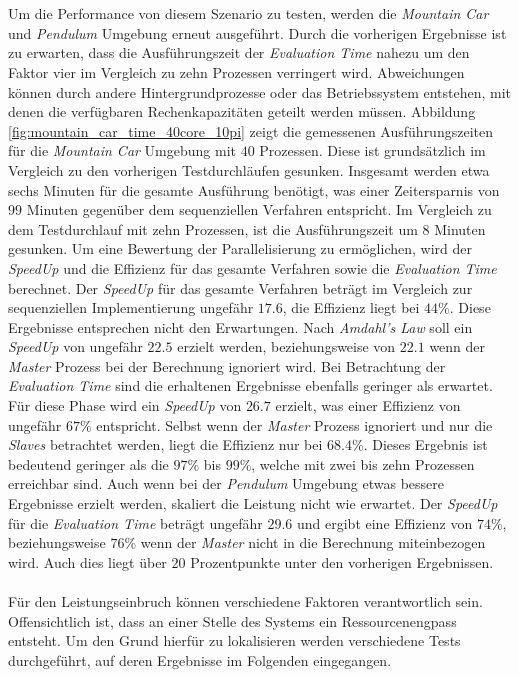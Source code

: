 \\\\
Um die Performance von diesem Szenario zu testen, werden die \emph{Mountain Car} und \emph{Pendulum} Umgebung erneut ausgeführt. Durch die vorherigen Ergebnisse ist zu erwarten, dass die Ausführungszeit der \emph{Evaluation Time} nahezu um den Faktor vier im Vergleich zu zehn Prozessen verringert wird. Abweichungen können durch andere Hintergrundprozesse oder das Betriebssystem entstehen, mit denen die verfügbaren Rechenkapazitäten geteilt werden müssen. Abbildung \ref{fig:mountain_car_time_40core_10pi} zeigt die gemessenen Ausführungszeiten für die \emph{Mountain Car} Umgebung mit $40$ Prozessen. Diese ist grundsätzlich im Vergleich zu den vorherigen Testdurchläufen gesunken. Insgesamt werden etwa sechs Minuten für die gesamte Ausführung benötigt, was einer Zeitersparnis von $99$ Minuten gegenüber dem sequenziellen Verfahren entspricht. Im Vergleich zu dem Testdurchlauf mit zehn Prozessen, ist die Ausführungszeit um 8 Minuten gesunken. Um eine Bewertung der Parallelisierung zu ermöglichen, wird der \emph{SpeedUp} und die Effizienz für das gesamte Verfahren sowie die \emph{Evaluation Time} berechnet.  Der \emph{SpeedUp} für das gesamte Verfahren beträgt im Vergleich zur sequenziellen Implementierung ungefähr $17.6$, die Effizienz liegt bei $44\%$. Diese Ergebnisse entsprechen nicht den Erwartungen. Nach \emph{Amdahl's Law} soll ein \emph{SpeedUp} von ungefähr $22.5$ erzielt werden, beziehungsweise von $22.1$ wenn der \emph{Master} Prozess bei der Berechnung ignoriert wird. Bei Betrachtung der \emph{Evaluation Time} sind die erhaltenen  Ergebnisse ebenfalls geringer als erwartet. Für diese Phase wird ein \emph{SpeedUp} von $26.7$ erzielt, was einer Effizienz von ungefähr $67\%$ entspricht. Selbst wenn der \emph{Master} Prozess ignoriert und nur die \emph{Slaves} betrachtet werden, liegt die Effizienz nur bei $68.4\%$. Dieses Ergebnis ist bedeutend geringer als die $97\%$ bis $99\%$, welche mit zwei bis zehn Prozessen erreichbar sind. Auch wenn bei der \emph{Pendulum} Umgebung etwas bessere Ergebnisse erzielt werden, skaliert die Leistung nicht wie erwartet. Der \emph{SpeedUp} für die \emph{Evaluation Time} beträgt ungefähr $29.6$ und ergibt eine Effizienz von $74\%$, beziehungsweise $76\%$ wenn der \emph{Master} nicht in die Berechnung miteinbezogen wird. Auch dies liegt über $20$ Prozentpunkte unter den vorherigen Ergebnissen. 
\\\\
Für den Leistungseinbruch können verschiedene Faktoren verantwortlich sein. Offensichtlich ist, dass an einer Stelle des Systems ein Ressourcenengpass entsteht. Um den Grund hierfür zu lokalisieren werden verschiedene Tests durchgeführt, auf deren Ergebnisse im Folgenden eingegangen. 

